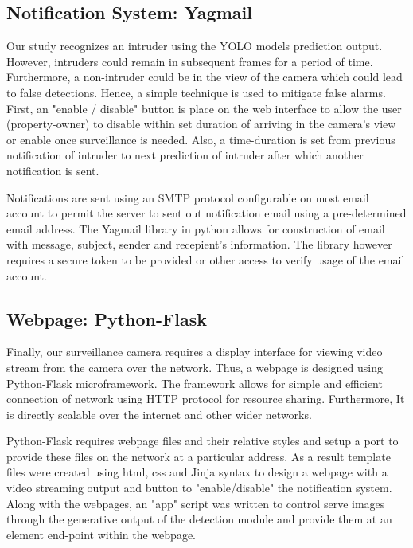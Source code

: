 \documentclass[../../main.tex]{subfiles}
\begin{document}
                \subsection{Notification System: Yagmail}
                    Our study recognizes an intruder using the YOLO models prediction output. However, intruders could remain in subsequent frames for a period of time. Furthermore, a non-intruder could be in the view of the camera which could lead to false detections. Hence, a simple technique is used to mitigate false alarms. First, an "enable / disable" button is place on the web interface to allow the user (property-owner) to disable within set duration of arriving in the camera's view or enable once surveillance is needed. Also, a time-duration is set from previous notification of intruder to next prediction of intruder after which another notification is sent.

                    Notifications are sent using an SMTP protocol configurable on most email account to permit the server to sent out notification email using a pre-determined email address. The Yagmail library in python allows for construction of email with message, subject, sender and recepient's information. The library however requires a secure token to be provided or other access to verify usage of the email account.

                \subsection{Webpage: Python-Flask}
                    Finally, our surveillance camera requires a display interface for viewing video stream from the camera over the network. Thus, a webpage is designed using Python-Flask microframework. The framework allows for simple and efficient connection of network using HTTP protocol for resource sharing. Furthermore, It is directly scalable over the internet and other wider networks.

                    Python-Flask requires webpage files and their relative styles and setup a port to provide these files on the network at a particular address. As a result template files were created using html, css and Jinja syntax to design a webpage with a video streaming output and button to "enable/disable" the notification system. Along with the webpages, an "app" script was written to control serve images through the generative output of the detection module and provide them at an element end-point within the webpage.
\end{document}
